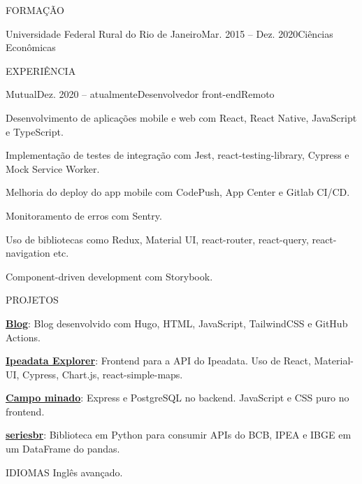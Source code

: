 \documentclass{resume}
\begin{document}

\begin{rSection}{FORMAÇÃO}
  \begin{rSubsection}{Universidade Federal Rural do Rio de Janeiro}{Mar. 2015 --
    Dez. 2020}{Ciências Econômicas}{}
  \end{rSubsection}
\end{rSection}


\begin{rSection}{EXPERIÊNCIA}
  \begin{rSubsection}{Mutual}{Dez. 2020 -- atualmente}{Desenvolvedor
    front-end}{Remoto}
  \item Desenvolvimento de aplicações mobile e web com React, React Native,
    JavaScript e TypeScript.
  \item Implementação de testes de integração com Jest, react-testing-library,
    Cypress e Mock Service Worker.
  \item Melhoria do deploy do app mobile com CodePush, App Center e Gitlab CI/CD.
  \item Monitoramento de erros com Sentry.
  \item Uso de bibliotecas como Redux, Material UI, react-router, react-query,
    react-navigation etc.
  \item Component-driven development com Storybook.
  \end{rSubsection}
\end{rSection}


\begin{rSection}{PROJETOS}
  \begin{rSubsection}{}{}{}{}
  \item \href{https://phelipetls.github.io}{\textbf{Blog}}: Blog
    desenvolvido com Hugo, HTML, JavaScript, TailwindCSS e GitHub Actions.
  \item \href{http://ipeadata-explorer.surge.sh}{\textbf{Ipeadata Explorer}}:
    Frontend para a API do Ipeadata. Uso de React, Material-UI, Cypress,
    Chart.js, react-simple-maps.
  \item \href{https://github.com/phelipetls/minesweeper.js}{\textbf{Campo
    minado}}: Express e PostgreSQL no backend. JavaScript e CSS puro no
    frontend.
  \item \href{https://github.com/phelipetls/seriesbr}{\textbf{seriesbr}}:
    Biblioteca em Python para consumir APIs do BCB, IPEA e IBGE em um DataFrame
    do pandas.
  \end{rSubsection}
\end{rSection}


\begin{rSection}{IDIOMAS}
  Inglês avançado.
\end{rSection}
\end{document}
